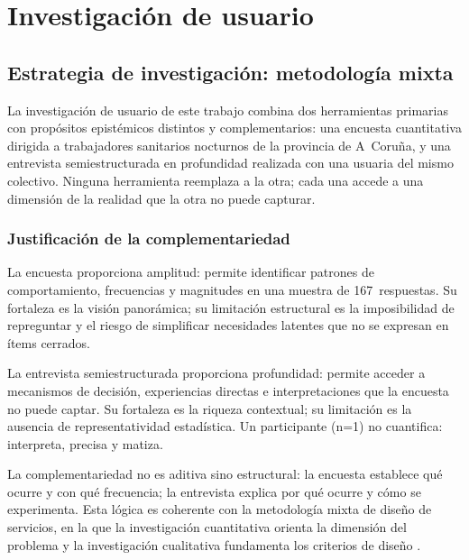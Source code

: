 \section{Investigación de usuario}\label{sec:investigacion-usuario}\label{cap:investigacion}

\subsection{Estrategia de investigación: metodología mixta}
\label{sec:estrategia-investigacion}

La investigación de usuario de este trabajo combina dos herramientas primarias con propósitos epistémicos distintos y complementarios: una encuesta cuantitativa dirigida a trabajadores sanitarios nocturnos de la provincia de A~Coruña, y una entrevista semiestructurada en profundidad realizada con una usuaria del mismo colectivo. Ninguna herramienta reemplaza a la otra; cada una accede a una dimensión de la realidad que la otra no puede capturar.

\subsubsection{Justificación de la complementariedad}
\label{sec:justificacion-complementariedad}

La encuesta proporciona amplitud: permite identificar patrones de comportamiento, frecuencias y magnitudes en una muestra de 167~respuestas. Su fortaleza es la visión panorámica; su limitación estructural es la imposibilidad de repreguntar y el riesgo de simplificar necesidades latentes que no se expresan en ítems cerrados.

La entrevista semiestructurada proporciona profundidad: permite acceder a mecanismos de decisión, experiencias directas e interpretaciones que la encuesta no puede captar. Su fortaleza es la riqueza contextual; su limitación es la ausencia de representatividad estadística. Un participante (n=1) no cuantifica: interpreta, precisa y matiza.

La complementariedad no es aditiva sino estructural: la encuesta establece qué ocurre y con qué frecuencia; la entrevista explica por qué ocurre y cómo se experimenta. Esta lógica es coherente con la metodología mixta de diseño de servicios, en la que la investigación cuantitativa orienta la dimensión del problema y la investigación cualitativa fundamenta los criterios de diseño \parencite{LouridoRegueira2026}.

